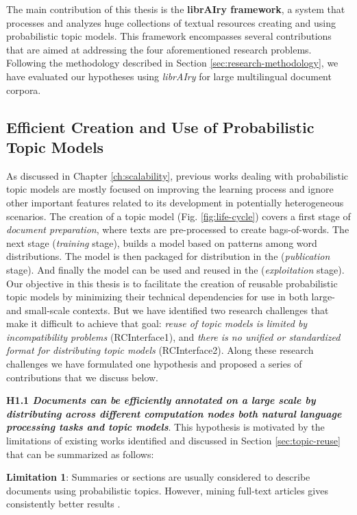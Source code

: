 The main contribution of this thesis is the \textbf{librAIry framework}, a system that processes and analyzes huge collections of textual resources creating and using probabilistic topic models. This framework encompasses several contributions that are aimed at addressing the four aforementioned research problems. Following the methodology described in Section \ref{sec:research-methodology}, we have evaluated our hypotheses using \textit{librAIry} for large multilingual document corpora. 

\subsection{Efficient Creation and Use of Probabilistic Topic Models}

As discussed in Chapter \ref{ch:scalability}, previous works dealing with probabilistic topic models are mostly focused on improving the learning process and ignore other important features related to its development in potentially heterogeneous scenarios. The creation of a topic model (Fig. \ref{fig:life-cycle}) covers a first stage of \textit{document preparation}, where texts are pre-processed to create bags-of-words. The next stage (\textit{training} stage),  builds a model based on patterns among word distributions. The model is then packaged for distribution in the (\textit{publication} stage). And finally the model can be used and reused in the (\textit{exploitation} stage). Our objective in this thesis is to facilitate the creation of reusable probabilistic topic models by minimizing their technical dependencies for use in both large- and small-scale contexts. But we have identified two research challenges that make it difficult to achieve that goal:  \textit{reuse of topic models is limited by incompatibility problems} (RCInterface1), and \textit{there is no unified or standardized format for distributing topic models} (RCInterface2). Along these research challenges we have formulated one hypothesis and proposed a series of contributions that we discuss below.


\textbf{H1.1 \textit{Documents can be efficiently annotated on a large scale by distributing across different computation nodes both natural language processing tasks and topic models}}. This hypothesis is motivated by the limitations of existing works identified and discussed in Section \ref{sec:topic-reuse} that can be summarized as follows:

\textbf{Limitation 1}: Summaries or sections are usually considered to describe documents using probabilistic topics. However, mining full-text articles gives consistently better results \citep{Westergaard2017}.

